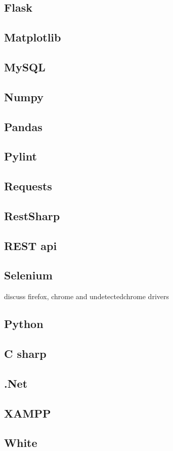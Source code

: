 \documentclass{thesis-ekf}
\theoremstyle{definition}
\theoremstyle{remark}
\begin{document}
{\subsection{Flask}
\subsection{Matplotlib}
\subsection{MySQL}
\subsection{Numpy}
\subsection{Pandas}
\subsection{Pylint}
\subsection{Requests}
\subsection{RestSharp}
\subsection{REST api}
\subsection{Selenium}
discuss firefox, chrome and undetectedchrome drivers
\subsection{Python}
\subsection{C sharp}
\subsection{.Net}
\subsection{XAMPP}
\subsection{White}
}
\end{document}
